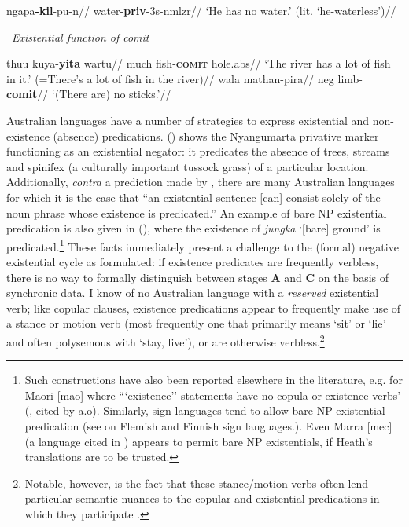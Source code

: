 \documentclass[usenames,dvipsnames,11pt]{article}
\begin{document}
{\a\begingl\gla\rightcomment{[Muruwari]}ngapa\textbf{-kil}-pu-n//
\glb water-\textbf{\gls{priv}}-3\gls{s}-\gls{nmlzr}//
\glft`He has no water.' (lit. `he-waterless')// \endgl
 \xe

\pex~\textit{Existential function of \gls{comit}}
	
\a\begingl%
	\gla \rightcomment{[Muruwari]}thuu kuya-\textbf{yita} wartu//
	\glb much fish-\textsc{\textbf{comit}} hole.\gls{abs}//
	\glft`The river has a lot of fish in it.' (=There's a lot of fish in the river)//\endgl
	\a\begingl\gla\rightcomment{[Muruwari]}wala mathan-pira//
	\glb \gls{neg} limb-\textbf{\gls{comit}}//
	\glft`(There are) no sticks.'//\endgl
\xe




Australian languages have a number of strategies to express existential and non-existence (absence) predications. () shows the Nyangumarta privative marker functioning as an existential negator: it predicates the absence of trees, streams and spinifex (a culturally important tussock grass) of a particular location. Additionally, \textit{contra} a prediction made by \citet[19]{Croft1991}, there are many Australian languages for which it is the case that ``an existential sentence [can] consist solely of the noun phrase whose existence is predicated.'' An example of bare NP existential predication is also given in (), where the existence of \textit{jungka} `[bare] ground' is predicated.\footnote{Such constructions have also been reported elsewhere in the literature, e.g. for Māori [\gls{mao}] where ```existence'' statements have no copula or existence verbs' (\citealp[78]{Bauer1993}, cited by \citealp{Chung2004} a.o). Similarly, sign languages tend to allow bare-NP existential predication (see \citealt[26ff]{deWeert2016} on Flemish and Finnish sign languages.). Even Marra [\gls{mec}] (a language cited in \citealt[14]{Croft1991}) appears to permit bare NP existentials, if Heath's \citeyearpar[364]{Heath1981} translations are to be trusted.}
 These facts immediately present a challenge to the (formal) negative existential cycle as formulated: if existence predicates are frequently verbless, there is no way to formally distinguish between stages \textbf{A} and \textbf{C} on the basis of synchronic data. I know of no Australian language with a \textit{reserved} existential verb; like copular clauses, existence predications appear to frequently make use of a stance or motion verb (most frequently one that primarily means `sit' or `lie' and often polysemous with `stay, live'), or are otherwise verbless.\footnote{Notable, however, is the fact that these stance/motion verbs often lend particular semantic nuances to the copular and existential predications in which they participate \citep[see e.g. ][610-611]{Wilkinson1991}.}

}
\end{document}
